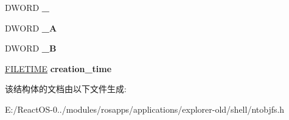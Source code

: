 \begin{DoxyCompactItemize}
D\+W\+O\+RD {\bfseries \+\_}
\item 
\mbox{\label{struct_nt_object_a080984a21fe888f96132d32e3b6a7dd9}} 
D\+W\+O\+RD {\bfseries \+\_\+A}
\item 
\mbox{\label{struct_nt_object_a5d4fa9a187fbf3999743027484b2c85d}} 
D\+W\+O\+RD {\bfseries \+\_\+B}
\item 
\mbox{\label{struct_nt_object_adeef246144b95ac532fe281907d7d17c}} 
\hyperlink{struct___f_i_l_e_t_i_m_e}{F\+I\+L\+E\+T\+I\+ME} {\bfseries creation\+\_\+time}
\end{DoxyCompactItemize}


该结构体的文档由以下文件生成\+:\begin{DoxyCompactItemize}
\item 
E\+:/\+React\+O\+S-\/0../modules/rosapps/applications/explorer-\/old/shell/ntobjfs.\+h\end{DoxyCompactItemize}
